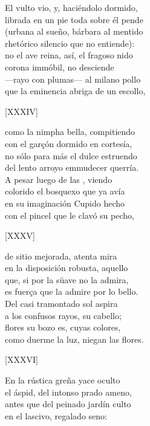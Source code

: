 \documentclass[11pt,a4paper,twoside]{article}
\begin{document}
El vulto vio, y, haciéndolo dormido,\\
librada en un pie toda sobre él pende\\
(urbana al sueño, bárbara al mentido\\
rhetórico silencio que no entiende):\\
no el ave reina, así, el fragoso nido\\
corona immóbil,  no desciende\\
—rayo con plumas— al milano pollo\\
que la eminencia abriga de un escollo,\pend
\begin{center}
	[XXXIV]
\end{center}\pstart
como la nimpha bella, compitiendo\\
con el garçón dormido en cortesía,\\
no sólo para más el dulce estruendo\\
del lento arroyo emmudecer querría.\\
A pesar luego de las , viendo\\ colorido el bosquexo que ya avía\\
en su imaginación Cupido hecho\\
con el pincel que le clavó su pecho,\pend
\begin{center}
	[XXXV]
\end{center}\pstart
de sitio mejorada, atenta mira\\
en la disposición robusta, aquello\\
que, si por la süave no la admira,\\
es fuerça que la admire por lo bello.\\
Del casi tramontado sol aspira\\
a los confusos rayos, su cabello;\\
flores su bozo es, cuyas colores,\\
como duerme la luz, niegan las flores.\pend
\begin{center}
	[XXXVI]
\end{center}\pstart
En la rústica greña yace oculto\\
el áspid, del intonso prado ameno,\\
antes que del peinado jardín culto\\
en el lascivo, regalado seno:\\
\end{document}

